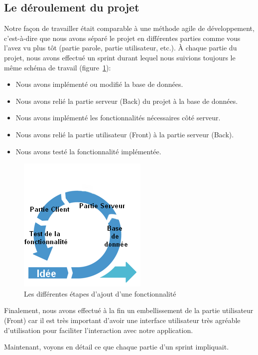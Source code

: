 \documentclass[12pt,french]{article}
\begin{document}
\subsection{Le déroulement du projet}

Notre façon de travailler était comparable à une méthode agile de développement, c'est-à-dire que nous avons séparé le projet en différentes parties comme vous l'avez vu plus tôt (partie parole, partie utilisateur, etc.). À chaque partie du projet, nous avons effectué un \gls{sprint} durant lequel nous suivions toujours le même schéma de travail (figure~\ref{figure7}):

\begin{itemize}
	\item Nous avons implémenté ou modifié la base de données.
	\item Nous avons relié la partie serveur (\gls{Back}) du projet à la base de données.
	\item Nous avons implémenté les fonctionnalités nécessaires côté serveur.
	\item Nous avons relié la partie utilisateur (\gls{Front}) à la partie serveur (\gls{Back}).
	\item Nous avons testé la fonctionnalité implémentée.
\end{itemize}

\begin{figure}[H]
	\centering
	\includegraphics[scale=1]{agile.png}
	\caption{Les différentes étapes d'ajout d'une fonctionnalité}
	\label{figure7} 
\end{figure}

Finalement, nous avons effectué à la fin un embellissement de la partie utilisateur (\gls{Front}) car il est très important d'avoir une interface utilisateur très agréable d'utilisation pour faciliter l'interaction avec notre application.

Maintenant, voyons en détail ce que chaque partie d'un \gls{sprint} impliquait.
\end{document}
